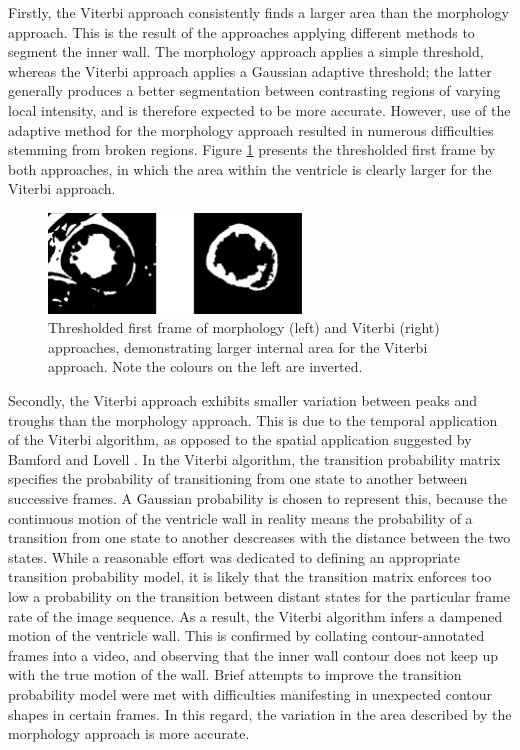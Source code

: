 Firstly, the Viterbi approach consistently finds a larger area than the morphology approach. This is the result of the approaches applying different methods to segment the inner wall. The morphology approach applies a simple threshold, whereas the Viterbi approach applies a Gaussian adaptive threshold; the latter generally produces a better segmentation between contrasting regions of varying local intensity, and is therefore expected to be more accurate. However, use of the adaptive method for the morphology approach resulted in numerous difficulties stemming from broken regions. Figure \ref{fig:thresh_comparison} presents the thresholded first frame by both approaches, in which the area within the ventricle is clearly larger for the Viterbi approach.

\begin{figure}[ht]
  \centering
  \includegraphics[width=0.6\textwidth]{images/q1_thresh_comparison.png}
  \caption{Thresholded first frame of morphology (left) and Viterbi (right) approaches, demonstrating larger internal area for the Viterbi approach. Note the colours on the left are inverted.}
  \label{fig:thresh_comparison}
\end{figure}

Secondly, the Viterbi approach exhibits smaller variation between peaks and troughs than the morphology approach. This is due to the temporal application of the Viterbi algorithm, as opposed to the spatial application suggested by Bamford and Lovell \cite{bamford_1998}. In the Viterbi algorithm, the transition probability matrix specifies the probability of transitioning from one state to another between successive frames. A Gaussian probability is chosen to represent this, because the continuous motion of the ventricle wall in reality means the probability of a transition from one state to another descreases with the distance between the two states. While a reasonable effort was dedicated to defining an appropriate transition probability model, it is likely that the transition matrix enforces too low a probability on the transition between distant states for the particular frame rate of the image sequence. As a result, the Viterbi algorithm infers a dampened motion of the ventricle wall. This is confirmed by collating contour-annotated frames into a video, and observing that the inner wall contour does not keep up with the true motion of the wall. Brief attempts to improve the transition probability model were met with difficulties manifesting in unexpected contour shapes in certain frames. In this regard, the variation in the area described by the morphology approach is more accurate.

